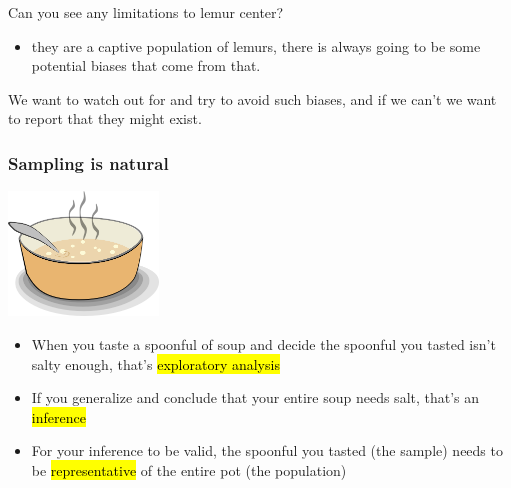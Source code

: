 \documentclass[11pt,containsverbatim,handout,xcolor=xelatex,dvipsnames,table]{beamer}
\begin{document}
\begin{frame}
{\begin{itemize}
\end{itemize}

Can you see any limitations to lemur center?
\begin{itemize}
\item they are a captive population of lemurs, there is always going to be some
potential biases that come from that.
\end{itemize}

We want to watch out for and try to avoid such biases, and if we can't we want to report that they might exist.

}

\end{frame}


\begin{frame}
\frametitle{Sampling is natural}

\begin{center}
\includegraphics[width=0.3\textwidth]{figures/soup}
\end{center}

\begin{itemize}

\item When you taste a spoonful of soup and decide the spoonful you tasted isn't salty enough, that's \hl{exploratory analysis}

\item If you generalize and conclude that your entire soup needs salt, that's an \hl{inference}

\item For your inference to be valid, the spoonful you tasted (the sample) needs to be \hl{representative} of the entire pot (the population)

\end{itemize}

\end{frame}
\end{document}
